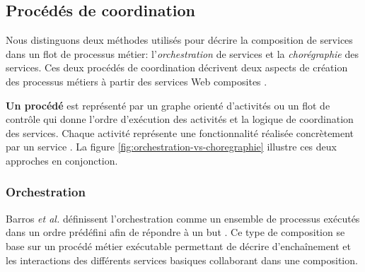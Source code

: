     \subsection{Procédés de coordination}
    \label{sec:proc-de-coord}
    



    Nous distinguons deux méthodes utilisés pour décrire la
    composition de services dans un flot de processus métier:
    l'\emph{orchestration} de services et la \emph{chorégraphie} des
    services. Ces deux procédés de coordination décrivent deux aspects
    de création des processus métiers à partir des services Web
    composites \cite{peltz2003web}.
    
    \textbf{Un procédé} est représenté par un graphe orienté
    d'activités ou un flot de contrôle qui donne l'ordre d'exécution
    des activités et la logique de coordination des services. Chaque
    activité représente une fonctionnalité réalisée concrètement par
    un service \cite{chollet2009orchestration}. La figure
    \ref{fig:orchestration-vs-choregraphie} illustre ces deux
    approches en conjonction.    
           

      \subsubsection{Orchestration}
      \label{sec:orchestration-sec}
      Barros \emph{et al.} \cite{barros2006standards} définissent
      l'orchestration comme un ensemble de processus exécutés dans un
      ordre prédéfini afin de répondre à un but
      \cite{lopez2008selection}. Ce type de composition se base sur un
      procédé métier exécutable permettant de décrire d'enchaînement
      et les interactions des différents services basiques collaborant
      dans une composition.
      
